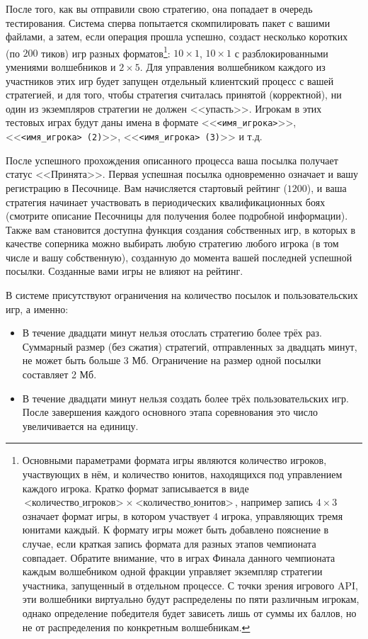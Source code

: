 После того, как вы отправили свою стратегию, она попадает в очередь тестирования. Система сперва попытается скомпилировать пакет с вашими
файлами, а затем, если операция прошла успешно, создаст несколько коротких (по $200$ тиков) игр разных форматов\footnote[16]{Основными
параметрами формата игры являются количество игроков, участвующих в нём, и количество юнитов, находящихся под управлением каждого игрока.
Кратко формат записывается в виде $\texttt{<количество\_игроков>}~\times~\texttt{<количество\_юнитов>}$, например запись $4\times3$ означает
формат игры, в котором участвует $4$ игрока, управляющих тремя юнитами каждый. К формату игры может быть добавлено пояснение в случае, если
краткая запись формата для разных этапов чемпионата совпадает. Обратите внимание, что в играх Финала данного чемпионата каждым волшебником
одной фракции управляет экземпляр стратегии участника, запущенный в отдельном процессе. С точки зрения игрового API, эти волшебники
виртуально будут распределены по пяти различным игрокам, однако определение победителя будет зависеть лишь от суммы их баллов, но не от
распределения по конкретным волшебникам.}: $10\times1$, $10\times1$ с разблокированными умениями волшебников и $2\times5$. Для управления
волшебником каждого из участников этих игр будет запущен отдельный клиентский процесс с вашей стратегией, и для того, чтобы стратегия
считалась принятой (корректной), ни один из экземпляров стратегии не должен <<упасть>>. Игрокам в этих тестовых играх будут даны имена в
формате <<\texttt{<имя\_игрока>}>>, <<\texttt{<имя\_игрока> (2)}>>, <<\texttt{<имя\_игрока> (3)}>> и т.д.

После успешного прохождения описанного процесса ваша посылка получает статус <<Принята>>. Первая успешная посылка одновременно означает и
вашу регистрацию в Песочнице. Вам начисляется стартовый рейтинг ($1200$), и ваша стратегия начинает участвовать в периодических
квалификационных боях (смотрите описание Песочницы для получения более подробной информации). Также вам становится доступна функция создания
собственных игр, в которых в качестве соперника можно выбирать любую стратегию любого игрока (в том числе и вашу собственную), созданную до
момента вашей последней успешной посылки. Созданные вами игры не влияют на рейтинг.

В системе присутствуют ограничения на количество посылок и пользовательских игр, а именно:
\vspace{-0.15in}
\begin{itemize}
  \item В течение двадцати минут нельзя отослать стратегию более трёх раз. Суммарный размер (без сжатия) стратегий, отправленных за двадцать
        минут, не может быть больше 3 Мб. Ограничение на размер одной посылки составляет 2 Мб.
\vspace{-0.10in}
  \item В течение двадцати минут нельзя создать более трёх пользовательских игр. После завершения каждого основного этапа соревнования это
        число увеличивается на единицу.
\vspace{-0.10in}
\end{itemize}

